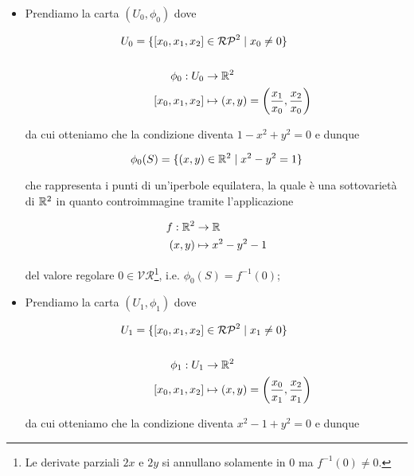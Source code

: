 \begin{itemize}
	\item Prendiamo la carta $ (U_{0},\phi_{0}) $ dove
	
	\begin{align}
		\begin{split}
			U_{0} = \{ [x_{0},x_{1},x_{2}] &\in \mathcal{RP}^{2} \mid x_{0} \neq 0 \}\\\\
			\phi_{0} : U_{0} &\to \mathbb{R}^{2}\\
			[x_{0},x_{1},x_{2}] &\mapsto (x,y) = \left( \dfrac{x_{1}}{x_{0}}, \dfrac{x_{2}}{x_{0}} \right)
		\end{split}
	\end{align}
	
	da cui otteniamo che la condizione diventa $ 1 - x^{2} + y^{2} = 0 $ e dunque
	
	\begin{equation}
		\phi_{0}(S) = \{ (x,y) \in \mathbb{R}^{2} \mid x^{2} - y^{2} = 1 \}
	\end{equation}

	che rappresenta i punti di un'iperbole equilatera, la quale è una sottovarietà di $ \mathbb{R}^{2} $ in quanto controimmagine tramite l'applicazione
	
	\begin{align}
		\begin{split}
			f : \mathbb{R}^{2} &\to \mathbb{R}\\
			(x,y) &\mapsto x^{2} - y^{2} - 1
		\end{split}
	\end{align}

	del valore regolare $ 0 \in \mathcal{VR} $\footnote{%
		Le derivate parziali $ 2x $ e $ 2y $ si annullano solamente in 0 ma $ f^{-1}(0) \neq 0 $.%
	}, i.e. $ \phi_{0}(S) = f^{-1}(0) $;
	
	\item Prendiamo la carta $ (U_{1},\phi_{1}) $ dove
	
	\begin{align}
		\begin{split}
			U_{1} = \{ [x_{0},x_{1},x_{2}] &\in \mathcal{RP}^{2} \mid x_{1} \neq 0 \}\\\\
			\phi_{1} : U_{1} &\to \mathbb{R}^{2}\\
			[x_{0},x_{1},x_{2}] &\mapsto (x,y) = \left( \dfrac{x_{0}}{x_{1}}, \dfrac{x_{2}}{x_{1}} \right)
		\end{split}
	\end{align}
	
	da cui otteniamo che la condizione diventa $ x^{2} - 1 + y^{2} = 0 $ e dunque
	

\end{itemize}
